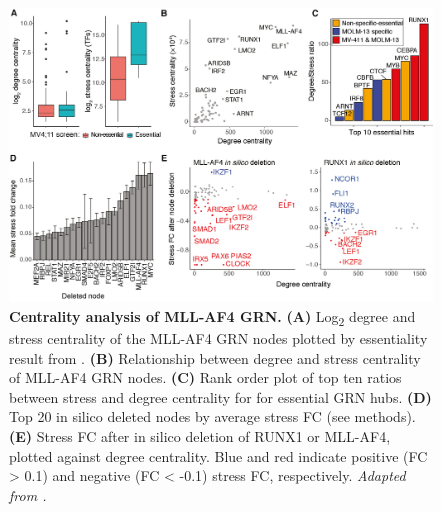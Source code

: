 \begin{figure}[htbp]
    \centering
    \includegraphics[width=\textwidth,height=\textheight,keepaspectratio]{figures/chapter4/ch4_centrality.png}
    \caption[{Centrality analysis of MLL-AF4 GRN.}]
    {\textbf{Centrality analysis of MLL-AF4 GRN.} 
    \textbf{(A)} Log\textsubscript{2} degree and stress centrality of the MLL-AF4 GRN nodes plotted by essentiality result from \cite{tzelepis_crispr_2016}. 
    \textbf{(B)} Relationship between degree and stress centrality of MLL-AF4 GRN nodes. 
    \textbf{(C)} Rank order plot of top ten ratios between stress and degree centrality for \cite{tzelepis_crispr_2016} for essential GRN hubs. 
    \textbf{(D)} Top 20 in silico deleted nodes by average stress FC (see methods). 
    \textbf{(E)} Stress FC after in silico deletion of RUNX1 or MLL-AF4, plotted against degree centrality. Blue and red indicate positive (FC > 0.1) and negative (FC < -0.1) stress FC, respectively. 
    \textit{Adapted from \cite{harman_kmt2a-aff1_2021}.}
    }
    \label{fig:ch4_centrality}
\end{figure}

